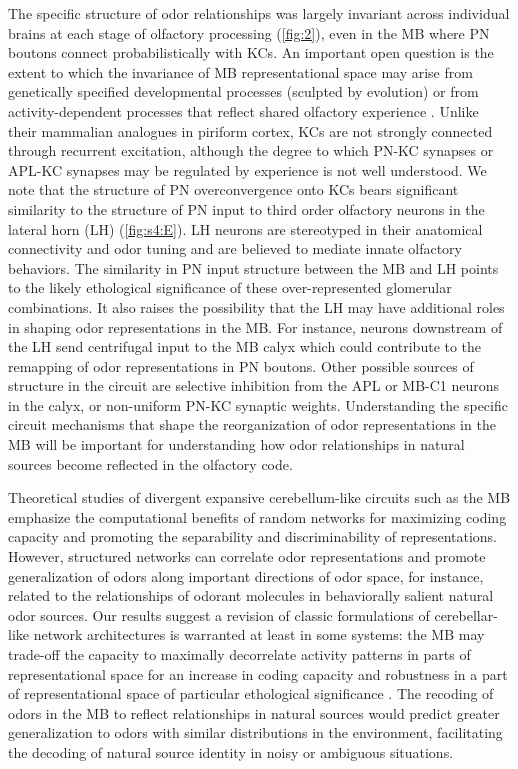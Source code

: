 \documentclass[12pt]{caltech_thesis}
\renewcommand{\cite}{{ }\autocite}
\begin{document}
\begin{refsection}
The specific structure of odor relationships was largely invariant across individual brains at each stage of olfactory processing (\cref{fig:2}), even in the MB where PN boutons connect probabilistically with KCs.
An important open question is the extent to which the invariance of MB representational space may arise from genetically specified developmental processes (sculpted by evolution) or from activity-dependent processes that reflect shared olfactory experience\cite{CorticalOdorSpace}.
Unlike their mammalian analogues in piriform cortex, KCs are not strongly connected through recurrent excitation, although the degree to which PN-KC synapses or APL-KC synapses may be regulated by experience is not well understood.
We note that the structure of PN overconvergence onto KCs bears significant similarity to the structure of PN input to third order olfactory neurons in the lateral horn (LH) (\cref{fig:s4:E}).
LH neurons are stereotyped in their anatomical connectivity and odor tuning and are believed to mediate innate olfactory behaviors.
The similarity in PN input structure between the MB and LH points to the likely ethological significance of these over-represented glomerular combinations.
It also raises the possibility that the LH may have additional roles in shaping odor representations in the MB.
For instance, neurons downstream of the LH send centrifugal input to the MB calyx\cite{LHNsToMBWithSplitsAndActivation} which could contribute to the remapping of odor representations in PN boutons.
Other possible sources of structure in the circuit are selective inhibition from the APL or MB-C1 neurons in the calyx, or non-uniform PN-KC synaptic weights.
Understanding the specific circuit mechanisms that shape the reorganization of odor representations in the MB will be important for understanding how odor relationships in natural sources become reflected in the olfactory code.

Theoretical studies of divergent expansive cerebellum-like circuits such as the MB emphasize the computational benefits of random networks for maximizing coding capacity and promoting the separability and discriminability of representations.
However, structured networks can correlate odor representations and promote generalization of odors along important directions of odor space, for instance, related to the relationships of odorant molecules in behaviorally salient natural odor sources.
Our results suggest a revision of classic formulations of cerebellar-like network architectures is warranted at least in some systems: the MB may trade-off the capacity to maximally decorrelate activity patterns in parts of representational space for an increase in coding capacity and robustness in a part of representational space of particular ethological significance\cite{StructuredCerebellarConns}.
The recoding of odors in the MB to reflect relationships in natural sources would predict greater generalization to odors with similar distributions in the environment, facilitating the decoding of natural source identity in noisy or ambiguous situations.


\end{refsection}
\end{document}
